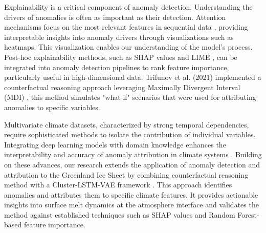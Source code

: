 Explainability is a critical component of anomaly detection. Understanding the drivers of anomalies is often as important as their detection. Attention mechanisms focus on the most relevant features in sequential data \cite{wang2022variational, kotipalli2024role}, providing interpretable insights into anomaly drivers through visualizations such as heatmaps. This visualization enables our understanding of the model's process. Post-hoc explainability methods, such as SHAP values \cite{lundberg2020local} and LIME \cite{garreau2020explaining}, can be integrated into anomaly detection pipelines to rank feature importance, particularly useful in high-dimensional data. Trifunov et al. (2021) \cite{trifunov2021anomaly} implemented a counterfactual reasoning approach leveraging Maximally Divergent Interval (MDI) \cite{barz2018detecting}, this method simulates "what-if" scenarios that were used for attributing anomalies to specific variables.

Multivariate climate datasets, characterized by strong temporal dependencies, require sophisticated methods to isolate the contribution of individual variables. Integrating deep learning models with domain knowledge enhances the interpretability and accuracy of anomaly attribution in climate systems \cite{jiang2024interpretable, yang2024interpretable}. Building on these advances, our research extends the application of anomaly detection and attribution to the Greenland Ice Sheet by combining counterfactual reasoning method with a Cluster-LSTM-VAE framework \cite{ale2024harnessing}. This approach identifies anomalies and attributes them to specific climate features. It provides actionable insights into surface melt dynamics at the atmosphere interface and validates the method against established techniques such as SHAP values and Random Forest-based feature importance.